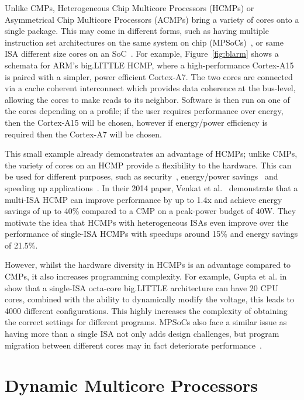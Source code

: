 Unlike CMPs, Heterogeneous Chip Multicore Processors (HCMPs) or Asymmetrical Chip Multicore Processors (ACMPs) bring a variety of cores onto a single package.
This may come in different forms, such as having multiple instruction set architectures on the same system on chip (MPSoCs)~\cite{venkat2014harnessingisa,venkatHipstr2016}, or same ISA different size cores on an SoC~\cite{bigLittle}.
For example, Figure~\ref{fig:blarm} shows a schemata for ARM's big.LITTLE HCMP, where a high-performance Cortex-A15 is paired with a simpler, power efficient Cortex-A7.
The two cores are connected via a cache coherent interconnect which provides data coherence at the bus-level, allowing the cores to make reads to its neighbor.
Software is then run on one of the cores depending on a profile; if the user requires performance over energy, then the Cortex-A15 will be chosen, however if energy/power efficiency is required then the Cortex-A7 will be chosen.

This small example already demonstrates an advantage of HCMPs; unlike CMPs, the variety of cores on an HCMP provide a flexibility to the hardware.
This can be used for different purposes, such as security~\cite{venkatHipstr2016}, energy/power savings~\cite{venkat2014harnessingisa} and speeding up applications~\cite{venkat2014harnessingisa}.
In their 2014 paper, Venkat et al.~\cite{venkat2014harnessingisa} demonstrate that a multi-ISA HCMP can improve performance by up to 1.4x and achieve energy savings of up to 40\% compared to a CMP on a peak-power budget of 40W.
They motivate the idea that HCMPs with heterogeneous ISAs even improve over the performance of single-ISA HCMPs with speedups around 15\% and energy savings of 21.5\%.

However, whilst the hardware diversity in HCMPs is an advantage compared to CMPs, it also increases programming complexity.
For example, Gupta et al. in ~\cite{Gupta2017Dypo} show that a single-ISA octa-core big.LITTLE architecture can have 20 CPU cores, combined with the ability to dynamically modify the voltage, this leads to 4000 different configurations.
This highly increases the complexity of obtaining the correct settings for different programs.
MPSoCs also face a similar issue as having more than a single ISA not only adds design challenges, but program migration between different cores may in fact deteriorate performance~\cite{DeVuystMigration2012}.

\section{Dynamic Multicore Processors}

